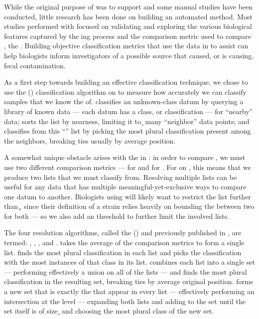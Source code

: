 While the original purpose of \cplop{} was to support \mst{} and some manual \mst{} studies have been conducted, little research has been done on building an automated \mst{} method.
Most studies performed with \cplop{} focused on validating and exploring the various biological features captured by the \pyro{}ing process and the comparison metric used to compare \pyros{}, the \pearson{}.
Building objective classification metrics that use the data in \cplop{} to assist \mst{} can help biologists inform investigators of a possible source that caused, or is causing, fecal contamination.


As a first step towards building an effective classification technique, we chose to use the \kNNlong{} (\kNN) classification algorithm on \cplop{} to measure how accurately we can classify samples that we know the \spec{} of.
\kNN{} classifies an unknown-class datum by querying a library of known data --- each datum has a class, or classification --- for ``nearby'' data; sorts the list by nearness, limiting it to \k{} many ``neighbor'' data points; and classifies from this ``\knnlong{}'' list by picking the most plural classification present among the neighbors, breaking ties usually by average position.

A somewhat unique obstacle arises with the \ecoli{} \isols{} in \cplop{}: in order to compare \isols{}, we must use two different comparison metrics --- \pearson{} for \Ssixt{} and \pearson{} for \Sfive{}.
For \kNN{} on \cplop{} \ecoli{} \isols{}, this means that we produce two \knnlong{} lists that we must classify from.
Resolving multiple \kNN{} lists can be useful for any data that has multiple meaningful-yet-exclusive ways to compare one datum to another.
Biologists using \kNN{} will likely want to restrict the list further than \k{}, since their definition of a strain relies heavily on bounding the \pearson{} between two \isols{} for both \itsshort{} --- so we also add an \a{} threshold to further limit the involved \kNN{} lists.

The four resolution algorithms, called the \krapmed{} (\krap{}) and previously published in \cite{DBLP:conf/bibm/McGovernDKBVG15}, are termed: \rmean{}, \rwinner{}, \runion{}, and \rintersect{}.
\rmean{} takes the average of the comparison metrics to form a single \kNN{} list.
\rwinner{} finds the most plural classification in each \kNN{} list and picks the classification with the most instances of that class in its list.
\runion{} combines each \kNN{} list into a single set --- performing effectively a union on all of the \kNN{} lists --- and finds the most plural classification in the resulting set, breaking ties by average original position.
\rintersect{} forms a new set that is exactly the \isols{} that appear in every \kNN{} list --- effectively performing an intersection at the \isol{} level --- expanding both lists and adding to the set until the set itself is of size \k{} and choosing the most plural class of the new set.

